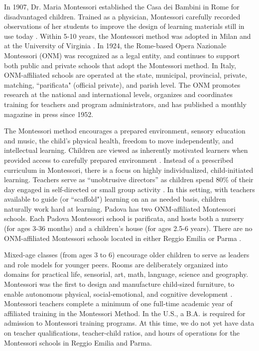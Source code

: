 \documentclass{article}
\theoremstyle{definition}
\theoremstyle{remark}
\begin{document}
In 1907, Dr. Maria Montessori established the Casa dei Bambini in Rome for disadvantaged children. Trained as a physician, Montessori carefully recorded observations of her students to improve the design of learning materials still in use today \citep{Schilling2011}. Within 5-10 years, the Montessori method was adopted in Milan and at the University of Virginia \citep{OECD_2001_Italy-Country-Note, Lillard2013}. In 1924, the Rome-based Opera Nazionale Montessori (ONM) was recognized as a legal entity, and continues to support both public and private schools that adopt the Montessori method. In Italy, ONM-affiliated schools are operated at the state, municipal, provincial, private, matching, ``parificata" (official private), and parish level. The ONM promotes research at the national and international levels, organizes and coordinates training for teachers and program administrators, and has published a monthly magazine in press since 1952.

The Montessori method encourages a prepared environment, sensory education and music, the child's physical health, freedom to move independently, and intellectual learning. Children are viewed as inherently motivated learners when provided access to carefully prepared environment \citep{Lillard2013}. Instead of a prescribed curriculum in Montessori, there is a focus on highly individualized, child-initiated learning. Teachers serve as ``unobtrusive directors'' as children spend 80\% of their day engaged in self-directed or small group activity \citep{Edwards_2002_ECRP}. In this setting, with teachers available to guide (or ``scaffold") learning on an as needed basis, children naturally work hard at learning. Padova has two ONM-affiliated Montessori schools. Each Padova Montessori school is parificata, and hosts both a nursery (for ages 3-36 months) and a children's house (for ages 2.5-6 years). There are no ONM-affiliated Montessori schools located in either Reggio Emilia or Parma \citep{ONM-website}. 

Mixed-age classes (from ages 3 to 6) encourage older children to serve as leaders and role models for younger peers. Rooms are deliberately organized into domains for practical life, sensorial, art, math, language, science and geography. Montessori was the first to design and manufacture child-sized furniture, to enable autonomous physical, social-emotional, and cognitive development \citep{Lillard2008, Schilling2011}. Montessori teachers complete a minimum of one full-time academic year of affiliated training in the Montessori Method. In the U.S., a B.A. is required for admission to Montessori training programs. At this time, we do not yet have data on teacher qualifications, teacher-child ratios, and hours of operations for the Montessori schools in Reggio Emilia and Parma.
\end{document}
